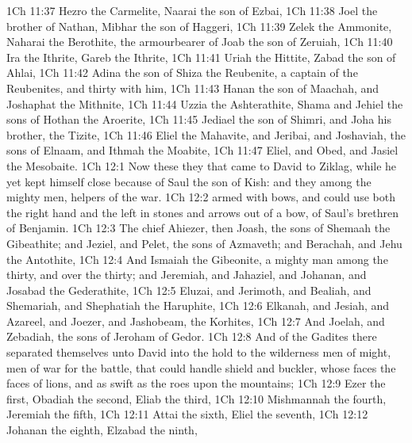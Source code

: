 \vs 1Ch 11:37 Hezro the Carmelite, Naarai the son of Ezbai,
\vs 1Ch 11:38 Joel the brother of Nathan, Mibhar the son of Haggeri,
\vs 1Ch 11:39 Zelek the Ammonite, Naharai the Berothite, the armourbearer of Joab the son of Zeruiah,
\vs 1Ch 11:40 Ira the Ithrite, Gareb the Ithrite,
\vs 1Ch 11:41 Uriah the Hittite, Zabad the son of Ahlai,
\vs 1Ch 11:42 Adina the son of Shiza the Reubenite, a captain of the Reubenites, and thirty with him,
\vs 1Ch 11:43 Hanan the son of Maachah, and Joshaphat the Mithnite,
\vs 1Ch 11:44 Uzzia the Ashterathite, Shama and Jehiel the sons of Hothan the Aroerite,
\vs 1Ch 11:45 Jediael the son of Shimri, and Joha his brother, the Tizite,
\vs 1Ch 11:46 Eliel the Mahavite, and Jeribai, and Joshaviah, the sons of Elnaam, and Ithmah the Moabite,
\vs 1Ch 11:47 Eliel, and Obed, and Jasiel the Mesobaite.
\vs 1Ch 12:1 Now these  they that came to David to Ziklag, while he yet kept himself close because of Saul the son of Kish: and they  among the mighty men, helpers of the war.
\vs 1Ch 12:2  armed with bows, and could use both the right hand and the left in  stones and  arrows out of a bow,  of Saul's brethren of Benjamin.
\vs 1Ch 12:3 The chief  Ahiezer, then Joash, the sons of Shemaah the Gibeathite; and Jeziel, and Pelet, the sons of Azmaveth; and Berachah, and Jehu the Antothite,
\vs 1Ch 12:4 And Ismaiah the Gibeonite, a mighty man among the thirty, and over the thirty; and Jeremiah, and Jahaziel, and Johanan, and Josabad the Gederathite,
\vs 1Ch 12:5 Eluzai, and Jerimoth, and Bealiah, and Shemariah, and Shephatiah the Haruphite,
\vs 1Ch 12:6 Elkanah, and Jesiah, and Azareel, and Joezer, and Jashobeam, the Korhites,
\vs 1Ch 12:7 And Joelah, and Zebadiah, the sons of Jeroham of Gedor.
\vs 1Ch 12:8 And of the Gadites there separated themselves unto David into the hold to the wilderness men of might,  men of war  for the battle, that could handle shield and buckler, whose faces  the faces of lions, and  as swift as the roes upon the mountains;
\vs 1Ch 12:9 Ezer the first, Obadiah the second, Eliab the third,
\vs 1Ch 12:10 Mishmannah the fourth, Jeremiah the fifth,
\vs 1Ch 12:11 Attai the sixth, Eliel the seventh,
\vs 1Ch 12:12 Johanan the eighth, Elzabad the ninth,
